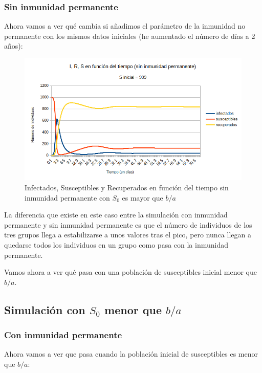 \documentclass[11pt,a4paper]{report}
\begin{document}
\newpage
\subsubsection{Sin inmunidad permanente}

Ahora vamos a ver qué cambia si añadimos el parámetro de la inmunidad no permanente con los mismos datos iniciales (he aumentado el número de días a 2 años):

\begin{figure}[htp]
\centering
\includegraphics[width=\textwidth]{img/sin_inmunidad/simulacion_ba_mayor.png}
\caption{Infectados, Susceptibles y Recuperados en función del tiempo sin inmunidad permanente con $S_0$ es mayor que $b/a$}
\label{}
\end{figure}

La diferencia que existe en este caso entre la simulación con inmunidad permanente y sin inmunidad permanente es que el número de individuos de los tres grupos llega a estabilizarse a unos valores tras el pico, pero nunca llegan a quedarse todos los individuos en un grupo como pasa con la inmunidad permanente.

Vamos ahora a ver qué pasa con una población de susceptibles inicial menor que $b/a$.

\newpage
\subsection{Simulación con $S_0$ menor que $b/a$}
\subsubsection{Con inmunidad permanente}

Ahora vamos a ver que pasa cuando la población inicial de susceptibles es menor que $b/a$:
\end{document}
